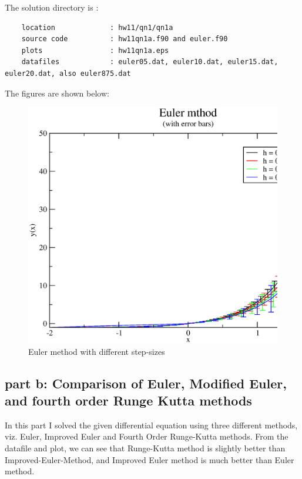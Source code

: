 \documentclass[11pt,a4paper,english]{article}
\begin{document}
		The solution directory is :\\
	\begin{verbatim}
	location             : hw11/qn1/qn1a
	source code          : hw11qn1a.f90 and euler.f90
	plots                : hw11qn1a.eps 
	datafiles            : euler05.dat, euler10.dat, euler15.dat, euler20.dat, also euler875.dat	  
	\end{verbatim}
			    The figures are shown below:\\
	\begin{figure}[h!]
	\centering
	\includegraphics [scale=0.6]{figures/hw11qn1a.eps}
	\caption{Euler method with different step-sizes }
	\end{figure}
	\clearpage
	
	\subsection{part b: Comparison of Euler, Modified Euler, and fourth order Runge Kutta methods}	
	In this part I solved the given differential equation using three different methods, viz.
	 Euler, Improved Euler and Fourth Order Runge-Kutta methods. From the datafile and plot, 
	 we can see that Runge-Kutta method is slightly better than Improved-Euler-Method, and Improved
	 Euler method is much better than Euler method.
	
\end{document}
